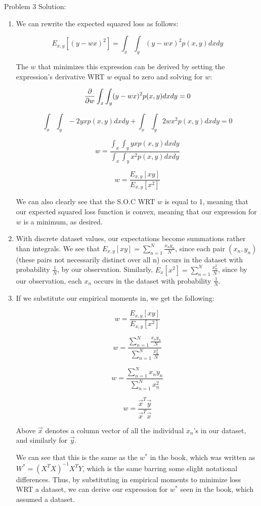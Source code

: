 \documentclass[submit]{harvardml}
\begin{document}
\newpage

Problem 3 Solution:

\begin{enumerate}
    \item We can rewrite the expected squared loss as follows:

    $$E_{x, y}[(y-wx)^2] = \int_{x}\int_{y} (y-wx)^2p(x,y) dxdy$$

    The $w$ that minimizes this expression can be derived by setting the expression's derivative WRT $w$ equal to zero and solving for $w$:

    $$\pdv{}{w}\int_{x}\int_{y} (y-wx)^2p(x,y) dxdy = 0$$

    $$\int_{x}\int_{y} -2yxp(x,y) dxdy + \int_{x}\int_{y} 2wx^2p(x,y) dxdy=0$$

    $$w = \frac{\int_{x}\int_{y} yxp(x,y) dxdy}{\int_{x}\int_{y} x^2p(x,y) dxdy}$$

    $$w = \frac{E_{x, y}[xy]}{E_{x, y}[x^2]}$$

    We can also clearly see that the S.O.C WRT $w$ is equal to 1, meaning that our expected squared loss function is convex, meaning that our expression for $w$ is a minimum, as desired.

    \item With discrete dataset values, our expectations become summations rather than integrals. We see that $E_{x, y}[xy] = \sum_{n=1}^N \frac{x_ny_n}{N}$, since each pair $(x_n, y_n)$ (these pairs not necessarily distinct over all n) occurs in the dataset with probability $\frac{1}{N}$, by our observation. Similarly, $E_{x}[x^2] = \sum_{n=1}^N \frac{x^2_n}{N}$, since by our observation, each $x_n$ occurs in the dataset with probability $\frac{1}{N}$.

    \item If we substitute our empirical moments in, we get the following:

    $$w = \frac{E_{x, y}[xy]}{E_{x, y}[x^2]}$$

    $$w = \frac{\sum_{n=1}^N \frac{x_ny_n}{N}}{\sum_{n=1}^N \frac{x^2_n}{N}}$$

    $$w = \frac{\sum_{n=1}^N x_ny_n}{\sum_{n=1}^N x^2_n}$$

    $$w = \frac{\vec{x}^T\vec{y}}{\vec{x}^T\vec{x}}$$

    Above $\vec{x}$ denotes a column vector of all the individual $x_n$'s in our dataset, and similarly for $\vec{y}$.

    We can see that this is the same as the $w^*$ in the book, which was written as $W^* = (X^TX)^{-1}X^TY$, which is the same barring some slight notational differences. Thus, by substituting in empirical moments to minimize loss WRT a dataset, we can derive our expression for $w^*$ seen in the book, which assumed a dataset.


\end{enumerate}
\end{document}
